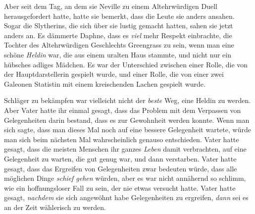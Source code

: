 Aber seit dem Tag, an dem sie Neville zu einem Altehrwürdigen Duell herausgefordert hatte, hatte sie bemerkt, dass die Leute sie anders ansahen. Sogar die Slytherins, die sich über sie lustig gemacht hatten, sahen sie jetzt anders an. Es dämmerte Daphne, dass es \emph{viel} mehr Respekt einbrachte, die Tochter des Altehrwürdigen Geschlechts Greengrass zu sein, wenn man eine schöne \emph{Heldin} war, die aus einem uralten Haus stammte, und nicht nur ein hübsches adliges Mädchen. Es war der Unterschied zwischen einer Rolle, die von der Hauptdarstellerin gespielt wurde, und einer Rolle, die von einer zwei Galeonen Statistin mit einem kreischenden Lachen gespielt wurde.

Schläger zu bekämpfen war vielleicht nicht der \emph{beste} Weg, eine Heldin zu werden. Aber Vater hatte ihr einmal gesagt, dass das Problem mit dem Verpassen von Gelegenheiten darin bestand, dass es zur Gewohnheit werden konnte. Wenn man sich sagte, dass man dieses Mal noch auf eine bessere Gelegenheit wartete, würde man sich beim nächsten Mal wahrscheinlich genauso entschieden. Vater hatte gesagt, dass die meisten Menschen ihr ganzes \emph{Leben} damit verbrachten, auf eine Gelegenheit zu warten, die gut genug war, und dann verstarben. Vater hatte gesagt, dass das Ergreifen von Gelegenheiten zwar bedeuten würde, dass alle möglichen Dinge \emph{schief gehen} würden, aber es war nicht annähernd so schlimm, wie ein hoffnungsloser Fall zu sein, der nie etwas versucht hatte. Vater hatte gesagt, \emph{nachdem} sie sich angewöhnt habe Gelegenheiten zu ergreifen, \emph{dann} sei es an der Zeit wählerisch zu werden.

